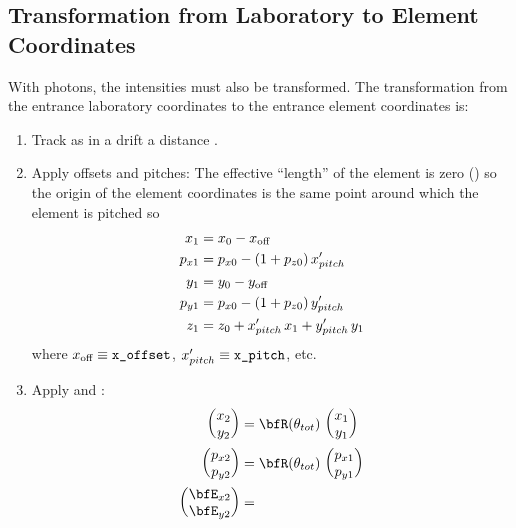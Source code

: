 
\subsection{Transformation from Laboratory to Element Coordinates}
\label{s:crystal.trans.le}

With photons, the intensities must also be transformed.
The transformation from the entrance laboratory coordinates to
the entrance element coordinates is:
\begin{enumerate}
\item
Track as in a drift a distance .
\item
{}
Apply offsets and pitches: The effective ``length'' of the element is
zero () so the origin of the element coordinates
is the same point around which the element is pitched so
\begin{align}
  x_1    &= x_0 - x_{\text{off}} \nonumber \\
  p_{x1} &= p_{x0} - (1 + p_{z0}) \, x'_{pitch} \nonumber \\
  y_1    &= y_0 - y_{\text{off}} \\
  p_{y1} &= p_{x0} - (1 + p_{z0}) \, y'_{pitch} \nonumber \\
  z_1    &= z_0 + x'_{pitch} \, x_1 + y'_{pitch} \, y_1 \nonumber
\end{align}
where $x_{\text{off}} \equiv \vn{x_offset}$, $x'_{pitch} \equiv \vn{x_pitch}$, etc.
\item
Apply  and :
\begin{align}
  \begin{pmatrix} x_2 \\ y_2 \end{pmatrix} &=
    \bfR (\theta_{tot}) \,   
  \begin{pmatrix} x_1 \\ y_1 \end{pmatrix} \CRNO
  \begin{pmatrix} p_{x2} \\ p_{y2} \end{pmatrix} &=
    \bfR (\theta_{tot}) \, 
  \begin{pmatrix} p_{x1} \\ p_{y1} \end{pmatrix} \label{xyrtxy} \\ 
  \begin{pmatrix} \bfE_{x2} \\ \bfE_{y2} \end{pmatrix} &=

\end{align}
\end{enumerate}
